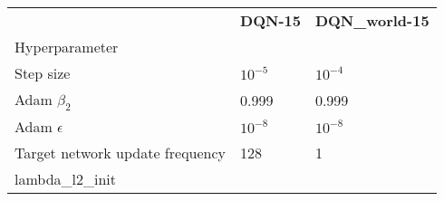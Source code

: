 \begin{tabular}{lll}
 & \bfseries DQN-15 & \bfseries DQN_world-15 \\
Hyperparameter &  &  \\
Step size & $10^{-5}$ & $10^{-4}$ \\
Adam $\beta_2$ & 0.999 & 0.999 \\
Adam $\epsilon$ & $10^{-8}$ & $10^{-8}$ \\
Target network update frequency & 128 & 1 \\
lambda_l2_init &  &  \\
\end{tabular}

